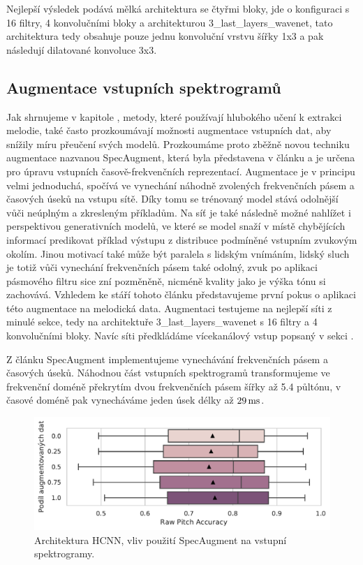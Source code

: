 Nejlepší výsledek podává mělká architektura se čtyřmi bloky, jde o konfiguraci s 16 filtry, 4 konvolučními bloky a architekturou 3\_last\_layers\_wavenet, tato architektura tedy obsahuje pouze jednu konvoluční vrstvu šířky 1x3 a pak následují dilatované konvoluce 3x3.

\subsection{Augmentace vstupních spektrogramů}

Jak shrnujeme v kapitole , metody, které používají hlubokého učení k extrakci melodie, také často prozkoumávají možnosti augmentace vstupních dat, aby snížily míru přeučení svých modelů. Prozkoumáme proto zběžně novou techniku augmentace nazvanou SpecAugment, která byla představena v článku \cite{Park2019} a je určena pro úpravu vstupních časově-frekvenčních reprezentací. Augmentace je v principu velmi jednoduchá, spočívá ve vynechání náhodně zvolených frekvenčních pásem a časových úseků na vstupu sítě. Díky tomu se trénovaný model stává odolnější vůči neúplným a zkresleným příkladům. Na síť je také následně možné nahlížet i perspektivou generativních modelů, ve které se model snaží v místě chybějících informací predikovat příklad výstupu z distribuce podmíněné vstupním zvukovým okolím. Jinou motivací také může být paralela s lidským vnímáním, lidský sluch je totiž vůči vynechání frekvenčních pásem také odolný, zvuk po aplikaci pásmového filtru sice zní pozměněně, nicméně kvality jako je výška tónu si zachovává. Vzhledem ke stáří tohoto článku představujeme první pokus o aplikaci této augmentace na melodická data. Augmentaci testujeme na nejlepší síti z minulé sekce, tedy na architektuře 3\_last\_layers\_wavenet s 16 filtry a 4 konvolučními bloky. Navíc síti předkládáme vícekanálový vstup popsaný v sekci .

Z článku SpecAugment implementujeme vynechávání frekvenčních pásem a časových úseků. Náhodnou část vstupních spektrogramů transformujeme ve frekvenční doméně překrytím dvou frekvenčních pásem šířky až 5.4 půltónu, v časové doméně pak vynecháváme jeden úsek délky až $29\,\rm ms$.

\begin{figure}[h]\centering
    \includegraphics[scale=0.6]{../img/figures/spectrogram_specaugment}
\caption{Architektura HCNN, vliv použití SpecAugment na vstupní spektrogramy.}\label{obr:hcnn_specaugment}
\end{figure}

